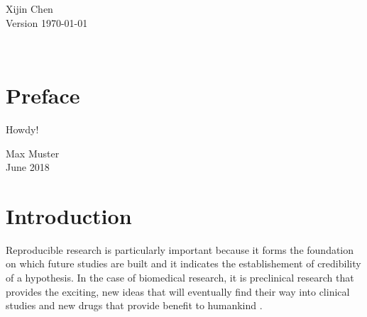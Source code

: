 \documentclass[11pt,a4paper,twoside]{book}\usepackage[]{graphicx}\usepackage[]{color}
\begin{document}





\graphicspath{{./figure/}}
\setcounter{tocdepth}{1}

\thispagestyle{empty}
\begin{center}
  \vspace*{6cm}{\bfseries\Huge
  Replication Success:\\[5mm] Sceptical Confidence Interval \\[5mm]
    
  }
  \vfill
  \rm

  \LARGE
  Xijin Chen\\[12mm]
  
  \normalsize
  Version \today
\end{center}
\newpage
\thispagestyle{empty}~
\newpage
{}

\thispagestyle{plain}
\tableofcontents
{}

\chapter*{Preface}
\thispagestyle{plain}

Howdy!

\bigskip

\begin{flushright}
  Max Muster\\
  June 2018
\end{flushright}


\cleardoublepage
{}







\chapter{Introduction}

Reproducible research is particularly important because it forms the foundation on which future studies are built and it indicates the establishement of credibility of a hypothesis. In the case of biomedical research, it is preclinical research that provides the exciting, new ideas that will eventually find their way into clinical studies and new drugs that provide benefit to humankind \citep{begley2015reproducibility}. 
\end{document}
